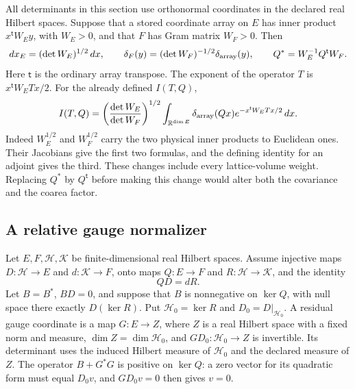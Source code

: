 \documentclass[11pt,letterpaper,reqno]{amsart}
\numberwithin{equation}{section}
\theoremstyle{definition}
\theoremstyle{remark}
\begin{document}
All determinants in this section use orthonormal coordinates in
the declared real Hilbert spaces. Suppose that a stored coordinate
array on $E$ has inner product $x^{\mathsf t}W_Ey$, with
$W_E>0$, and that $F$ has Gram matrix $W_F>0$. Then
\begin{equation}\label{gi:eq-coordinate-measures}
 dx_E=(\det W_E)^{1/2}\,dx,\qquad
 \delta_F(y)=(\det W_F)^{-1/2}\delta_{\rm array}(y),\qquad
 Q^*=W_E^{-1}Q^{\mathsf t}W_F.
\end{equation}
Here $\mathsf t$ is the ordinary array transpose. The exponent
of the operator $T$ is $x^{\mathsf t}W_ETx/2$. For the already defined $I(T,Q)$,
\begin{equation}\label{gi:eq-array-integral}
 I(T,Q)=\left(\frac{\det W_E}{\det W_F}\right)^{1/2}
 \int_{\mathbb R^{\dim E}}\delta_{\rm array}(Qx)
                         e^{-x^{\mathsf t}W_ETx/2}\,dx.
\end{equation}
Indeed $W_E^{1/2}$ and $W_F^{1/2}$ carry the two physical
inner products to Euclidean ones. Their Jacobians give the
first two formulas, and the defining identity for an adjoint
gives the third. These changes include every lattice-volume
weight. Replacing $Q^*$ by $Q^{\mathsf t}$ before making this
change would alter both the covariance and the coarea factor.

\subsection{A relative gauge normalizer}

Let $E,F,\mathcal H,\mathcal K$ be finite-dimensional real
Hilbert spaces. Assume injective maps
$D:\mathcal H\to E$ and $d:\mathcal K\to F$, onto maps
$Q:E\to F$ and $R:\mathcal H\to\mathcal K$, and the identity
\begin{equation}\label{gi:eq-gauge-chain}
                         QD=dR.
\end{equation}
Let $B=B^*$, $BD=0$, and suppose that $B$ is nonnegative on
$\ker Q$, with null space there exactly $D(\ker R)$.
Put $\mathcal H_0=\ker R$ and $D_0=D|_{\mathcal H_0}$.
A residual gauge coordinate is a map $G:E\to Z$, where
$Z$ is a real Hilbert space with a fixed norm and measure,
$\dim Z=\dim\mathcal H_0$, and
$GD_0:\mathcal H_0\to Z$ is invertible. Its determinant
uses the induced Hilbert measure of $\mathcal H_0$ and
the declared measure of $Z$.
The operator $B+G^*G$ is positive on $\ker Q$: a zero vector
for its quadratic form must equal $D_0v$, and $GD_0v=0$
then gives $v=0$.
\end{document}
